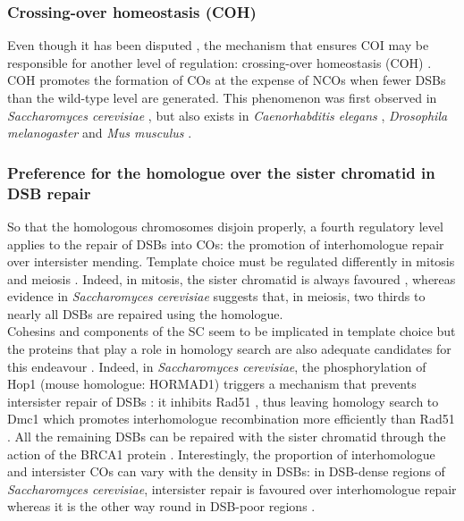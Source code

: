 \subsubsection{Crossing-over homeostasis (COH)}
Even though it has been disputed \citep{shinohara2008crossover}, the mechanism that ensures COI may be responsible for another level of regulation: crossing-over homeostasis (COH) \citep[reviewed in \citealp{youds2011choice}]{joshi2009pch2,zanders2009pch2delta}.
COH promotes the formation of COs at the expense of NCOs when fewer DSBs than the wild-type level are generated.
This phenomenon was first observed in \textit{Saccharomyces cerevisiae} \citep{martini2006crossover,chen2008global}, but also exists in \textit{Caenorhabditis elegans} \citep{yokoo2012cosa1,globus2012joy}, \textit{Drosophila melanogaster} \citep{mehrotra2006temporal} and \textit{Mus musculus} \citep{cole2012homeostatic}.



\subsubsection{Preference for the homologue over the sister chromatid in DSB repair}
So that the homologous chromosomes disjoin properly, a fourth regulatory level applies to the repair of DSBs into COs: the promotion of interhomologue repair over intersister mending.
Template choice must be regulated differently in mitosis and meiosis \citep{andersen2010meiotic}.
Indeed, in mitosis, the sister chromatid is always favoured \citep{kadyk1992sister,bzymek2010double}, whereas evidence in \textit{Saccharomyces cerevisiae} suggests that, in meiosis, two thirds \citep{goldfarb2010frequent} to nearly all \citep{pan2011hierarchical} DSBs are repaired using the homologue.\\

Cohesins and components of the SC seem to be implicated in template choice \citep[reviewed in \citealp{pradillo2011template}]{couteau2004component,kim2010sister} but the proteins that play a role in homology search are also adequate candidates for this endeavour \citep[reviewed in][]{youds2011choice}.
Indeed, in \textit{Saccharomyces cerevisiae}, the phosphorylation of Hop1 (mouse homologue: HORMAD1) triggers a mechanism that prevents intersister repair of DSBs \citep{niu2005partner}: it inhibits Rad51 \citep{niu2009regulation}, thus leaving homology search to Dmc1 which promotes interhomologue recombination more efficiently than Rad51 \citep{schwacha1997interhomolog}.
All the remaining DSBs can be repaired with the sister chromatid through the action of the BRCA1 protein \citep{adamo2008brc}.
Interestingly, the proportion of interhomologue and intersister COs can vary with the density in DSBs: in DSB-dense regions of \textit{Saccharomyces cerevisiae}, intersister repair is favoured over interhomologue repair whereas it is the other way round in DSB-poor regions \citep{hyppa2010crossover}.\\

